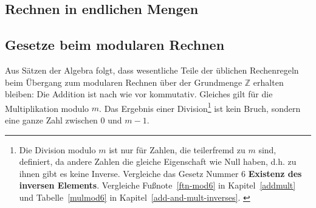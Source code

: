 \begin{refsegment}
\newpage
\section{Rechnen in endlichen Mengen}

\subsection{Gesetze beim modularen Rechnen}
\label{Laws-modular-calcs}

Aus Sätzen der Algebra folgt, dass wesentliche Teile der üblichen
Rechenregeln beim Übergang zum modularen Rechnen über der Grundmenge
$\mathbb{Z}$ erhalten bleiben: Die Addition ist nach wie vor kommutativ.
Gleiches gilt für die Multiplikation modulo $m$. Das Ergebnis einer
Division\footnote{%
Die Division modulo $m$ ist nur für Zahlen, die
teilerfremd zu $m$ sind, definiert, da
andere Zahlen die gleiche Eigenschaft wie Null haben, d.h. zu ihnen gibt es
keine Inverse.
Vergleiche das Gesetz Nummer 6 \textbf{Existenz des inversen Elements}.
Vergleiche Fußnote~\ref{ftn-mod6} in Kapitel~\ref{addmult} und
Tabelle~\ref{mulmod6} in Kapitel~\ref{add-and-mult-inverses}.
\label{ftn-res-divmodn}\label{ftn-zth-divmodn}
} ist kein Bruch, sondern eine ganze Zahl zwischen $0$ und $m-1$.


\end{refsegment}
